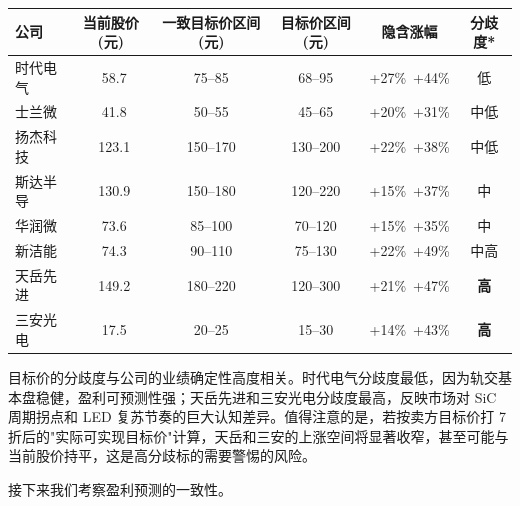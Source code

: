 \begin{exhibitbox}[表 7-4：一致目标价区间与隐含涨跌空间]
\centering
\small
\begin{tabularx}{\textwidth}{l c c c c c}
\toprule
\textbf{公司} & \textbf{当前股价(元)} & \textbf{一致目标价区间(元)} & \textbf{目标价区间(元)} & \textbf{隐含涨幅} & \textbf{分歧度*} \\
\midrule
\rowcolor{riskgreen!10}
时代电气 & ~58.7 & 75–85 & 68–95 & +27\%~+44\% & 低 \\
\rowcolor{riskgreen!10}
士兰微 & ~41.8 & 50–55 & 45–65 & +20\%~+31\% & 中低 \\
\rowcolor{riskamber!10}
扬杰科技 & ~123.1 & 150–170 & 130–200 & +22\%~+38\% & 中低 \\
\rowcolor{riskamber!10}
斯达半导 & ~130.9 & 150–180 & 120–220 & +15\%~+37\% & 中 \\
\rowcolor{riskamber!10}
华润微 & ~73.6 & 85–100 & 70–120 & +15\%~+35\% & 中 \\
\rowcolor{riskamber!10}
新洁能 & ~74.3 & 90–110 & 75–130 & +22\%~+49\% & 中高 \\
\rowcolor{riskred!10}
天岳先进 & ~149.2 & 180–220 & 120–300 & +21\%~+47\% & \textbf{高} \\
\rowcolor{riskred!10}
三安光电 & ~17.5 & 20–25 & 15–30 & +14\%~+43\% & \textbf{高} \\
\bottomrule
\end{tabularx}
\end{exhibitbox}

目标价的分歧度与公司的业绩确定性高度相关。时代电气分歧度最低，因为轨交基本盘稳健，盈利可预测性强；天岳先进和三安光电分歧度最高，反映市场对 SiC 周期拐点和 LED 复苏节奏的巨大认知差异。值得注意的是，若按卖方目标价打 7 折后的"实际可实现目标价"计算，天岳和三安的上涨空间将显著收窄，甚至可能与当前股价持平，这是高分歧标的需要警惕的风险。

接下来我们考察盈利预测的一致性。

